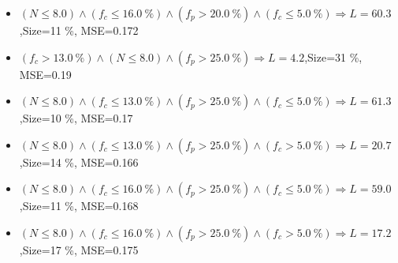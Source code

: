 \documentclass[numbered]{CSL}
\begin{document}
\begin{itemize}
\item $(N \leq 8.0) \land (f_c \leq 16.0~\%) \land (f_p > 20.0~\%) \land (f_c \leq 5.0~\%) \Rightarrow L = 60.3$,\hfill Size=11 \%, MSE=0.172
\item $(f_c > 13.0~\%) \land (N \leq 8.0) \land (f_p > 25.0~\%) \Rightarrow L = 4.2$,\hfill Size=31 \%, MSE=0.19
\item $(N \leq 8.0) \land (f_c \leq 13.0~\%) \land (f_p > 25.0~\%) \land (f_c \leq 5.0~\%) \Rightarrow L = 61.3$,\hfill Size=10 \%, MSE=0.17
\item $(N \leq 8.0) \land (f_c \leq 13.0~\%) \land (f_p > 25.0~\%) \land (f_c > 5.0~\%) \Rightarrow L = 20.7$,\hfill Size=14 \%, MSE=0.166
\item $(N \leq 8.0) \land (f_c \leq 16.0~\%) \land (f_p > 25.0~\%) \land (f_c \leq 5.0~\%) \Rightarrow L = 59.0$,\hfill Size=11 \%, MSE=0.168
\item $(N \leq 8.0) \land (f_c \leq 16.0~\%) \land (f_p > 25.0~\%) \land (f_c > 5.0~\%) \Rightarrow L = 17.2$,\hfill Size=17 \%, MSE=0.175
\end{itemize}
\end{document}
